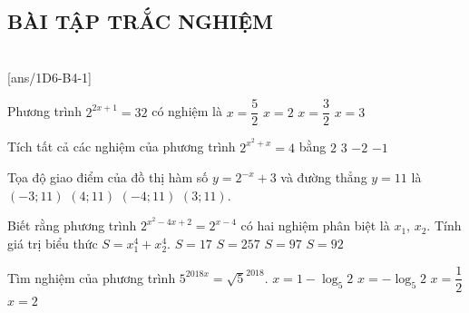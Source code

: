 \subsection{BÀI TẬP TRẮC NGHIỆM}
 \\
\setcounter{ex}{0}
[ans/1D6-B4-1]
\begin{ex}%
	Phương trình $2^{2x+1}=32$ có nghiệm là
	\choice
	{$x=\dfrac{5}{2}$}
	{\True $x=2$}
	{$x=\dfrac{3}{2}$}
	{$x=3$}
\end{ex}


\begin{ex}%
	Tích tất cả các nghiệm của phương trình $ 2^{x^2 + x } = 4 $ bằng
	\choice
	{$ 2 $}
	{$ 3 $}
	{\True $ -2 $}
	{$ -1 $}
\end{ex}

\begin{ex}
	Tọa độ giao điểm của đồ thị hàm số $y=2^{- x} + 3$ và đường thẳng $y=11$ là
	\choice
	{\True $\left(- 3; 11\right)$}
	{$\left(4; 11\right)$}
	{$\left(- 4; 11\right)$}
	{$\left(3; 11\right)$.}
\end{ex}

\begin{ex}%
	Biết rằng phương trình $2^{x^2-4x+2}=2^{x-4}$ có hai nghiệm phân biệt là $x_1$, $x_2$. Tính giá trị biểu thức $S=x_1^4+x_2^4$.
	\choice
	{$S=17$}
	{$S=257$}
	{\True $S=97$}
	{$S=92$}
\end{ex}

\begin{ex}%
	Tìm nghiệm của phương trình $5^{2018x}=\sqrt{5}^{2018}$.
	\choice
	{$x=1-\log_5 2$}
	{$x=-\log_5 2$}
	{\True $x=\dfrac{1}{2}$}
	{$x=2$}
\end{ex}

